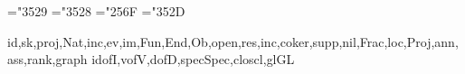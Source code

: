 

\def\pagedecor{\pageborder{rgb{.5 .9 .8}}{rgb{0 .3 .3}}{5}}
\def\setboxshadow{\def\boxshadowcolor{rgb{.3 .8 .7}}}
\def\contentbox{\bppbox{rgb{.7 1 .9}}{rgb{0 .3 .3}}{rgb{0 .4 .4}}}

\def\rmht#1{\vbox to0pt{\vss\hbox{#1}}}

\mathchardef\supsetneq="3529
\mathchardef\subsetneq="3528
\mathchardef\rtimes="256F
\mathchardef\nmid="352D

\commap{}
\commap{}
\commap{}
\commap{}

\commap{}
\commap{}

\commap{}
\commap{}

\makemathops\rm{id,sk,proj,Nat,inc,ev,im,Fun,End,Ob,open,res,inc,coker,supp,nil,Frac,loc,Proj,ann,ass,rank,graph}
\makemathopsA\rm{{idof}{I},{vof}{V},{dof}{D},{spec}{Spec},{clos}{cl},{gl}{GL}}



